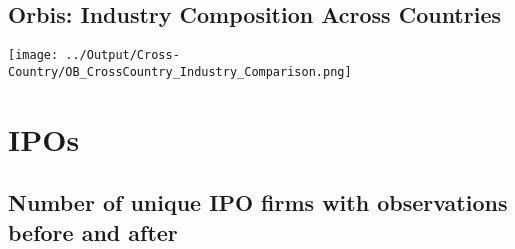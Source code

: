 \documentclass[12pt,notitlepage]{article}
\begin{document}



\subsection{Orbis: Industry Composition Across Countries}

\begin{center}
 \texttt{[image: ../Output/Cross-Country/OB\_CrossCountry\_Industry\_Comparison.png]}
\end{center}
\clearpage


\FloatBarrier
\section{IPOs} %
\label{sec:ipos}
\FloatBarrier




\subsection{Number of unique IPO firms with observations before and after}
\end{document}
